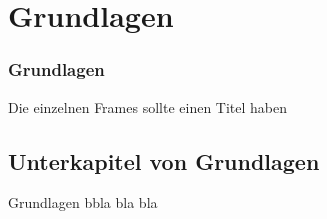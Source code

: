 \section{Grundlagen} 
\begin{frame}
\frametitle{Grundlagen} 
Die einzelnen Frames sollte einen Titel haben 
\end{frame}


\subsection{Unterkapitel von Grundlagen}
\begin{frame} 
Grundlagen bbla bla bla
\end{frame}